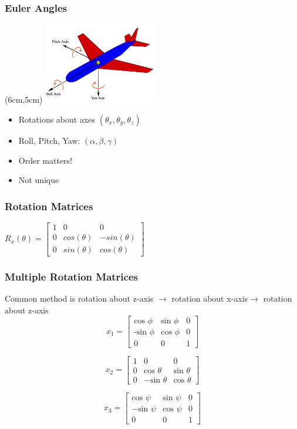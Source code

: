 \documentclass[serif,mathserif]{beamer}
\begin{document}
\begin{frame}
  \frametitle{Euler Angles}
  \begin{textblock*}{3cm}(6cm,5cm) %
  \includegraphics[width=5cm]{Images/plane.png}
  \end{textblock*}
  \begin{itemize}
    \item Rotations about axes $(\theta_x, \theta_y, \theta_z)$
    \item Roll, Pitch, Yaw: $(\alpha,\beta,\gamma)$
    \item Order matters!
    \item Not unique
  \end{itemize}
\end{frame}

\begin{frame}
  \frametitle{Rotation Matrices}
  \centering
    $ R_x(\theta) =
    \begin{bmatrix}
    1	&	0 				& 	0 \\
    0 	& 	cos(\theta)	&	-sin(\theta) \\
    0 	& 	sin(\theta) 	& 	cos(\theta)
    \end{bmatrix}$

\end{frame}

\begin{frame}
\frametitle{Multiple Rotation Matrices}
Common method is rotation about z-axis $\rightarrow$ rotation about x-axis$\rightarrow$ rotation about z-axis
  $$
x_1 =
\begin{bmatrix}
\text{cos }\phi & \text{sin } \phi & 0 \\
\text{-sin }\phi & \text{cos }\phi & 0 \\
0 & 0 & 1
\end{bmatrix}
$$

$$
x_2 =
\begin{bmatrix}
1 & 0 & 0 \\
0 & \text{cos } \theta & \text{sin } \theta \\
0 & -\text{sin } \theta & \text{cos } \theta
\end{bmatrix}
$$

$$
x_3 =
\begin{bmatrix}
\text{cos } \psi & \text{sin } \psi & 0 \\
- \text{sin } \psi & \text{cos } \psi & 0 \\
0 & 0 & 1
\end{bmatrix}
$$

\end{frame}
\end{document}
